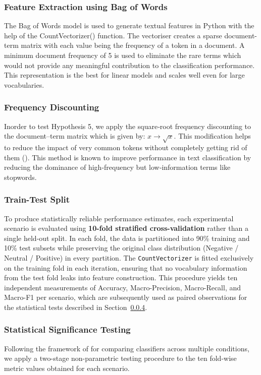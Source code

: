 \documentclass[a4paper,10pt]{article}
\begin{document}
\subsubsection{Feature Extraction using Bag of Words}
The Bag of Words model is used to generate textual features in Python with the help of the CountVectorizer() function. The vectoriser creates a sparse document-term matrix with each value being the frequency of a token in a document. A minimum document frequency of 5 is used to eliminate the rare terms which would not provide any meaningful contribution to the classification performance. This representation is the best for linear models and scales well even for large vocabularies.

\subsubsection{Frequency Discounting}
Inorder to test Hypothesis 5, we apply the square‑root frequency discounting to the document–term matrix which is given by: $x \rightarrow \sqrt{x}$. This modification helps to reduce the impact of very common tokens without completely getting rid of them (\cite{dogan2019term}). This method is known to improve performance in text classification by reducing the dominance of high‑frequency but low‑information terms like stopwords.

\subsubsection{Train-Test Split}
To produce statistically reliable performance estimates, each experimental
scenario is evaluated using \textbf{10-fold stratified cross-validation}
rather than a single held-out split. In each fold, the data is partitioned
into 90\% training and 10\% test subsets while preserving the original class
distribution (Negative / Neutral / Positive) in every partition. The
\texttt{CountVectorizer} is fitted exclusively on the training fold in each
iteration, ensuring that no vocabulary information from the test fold leaks
into feature construction. This procedure yields ten independent measurements
of Accuracy, Macro-Precision, Macro-Recall, and Macro-F1 per scenario,
which are subsequently used as paired observations for the statistical tests
described in Section~\ref{sec:stats}. 

\subsubsection{Statistical Significance Testing}\label{sec:stats}
Following the framework of \citet{demsarstats} for comparing classifiers
across multiple conditions, we apply a two-stage non-parametric testing
procedure to the ten fold-wise metric values obtained for each scenario.
\end{document}
